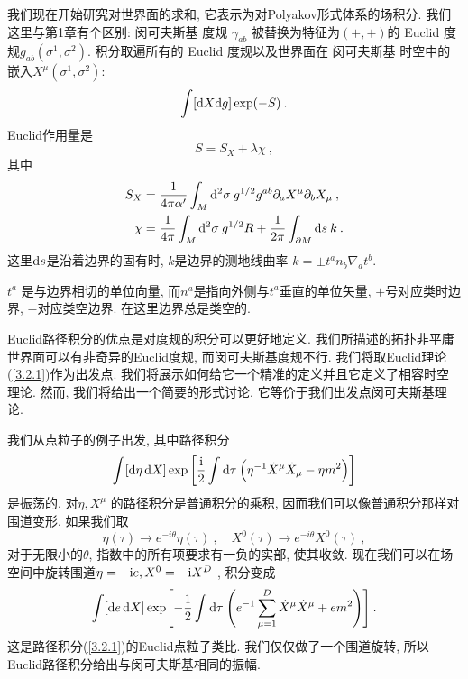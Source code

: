 我们现在开始研究对世界面的求和, 它表示为对Polyakov形式体系的场积分. 我们这里与第1章有个区别: 闵可夫斯基 度规 $\gamma_{ab}$ 被替换为特征为$(+,+)$的 Euclid 度规$g_{a b}(\sigma^{1}, \sigma^{2})$. 积分取遍所有的 Euclid 度规以及世界面在 闵可夫斯基 时空中的嵌入$X^{\mu}(\sigma^{1}, \sigma^{2})$: 
\begin{equation}\label{3.2.1}
\int[\mathrm{d} X \mathrm{d} g] \exp (-S) \:.
\end{equation}
Euclid作用量是
\begin{equation}
S=S_{X}+\lambda \chi \:, \label{3.2.2}
\end{equation}
其中
\begin{subequations}\label{3.2.3}
\begin{align}
S_{X}&=\frac{1}{4 \pi \alpha^{\prime}} \int_{M} \mathrm{d}^{2} \sigma \: g^{1 / 2} g^{a b} \partial_{a} X^{\mu} \partial_{b} X_{\mu} \:, \label{3.2.3a} \\
\chi&=\frac{1}{4 \pi} \int_{M} \mathrm{d}^{2} \sigma \: g^{1 / 2} R+\frac{1}{2 \pi} \int_{\partial M} \mathrm{d} s\: k \:. \label{3.2.3b}
\end{align}
\end{subequations}
这里$\mathrm{d} s$是沿着边界的固有时, $k$是边界的测地线曲率 $k=\pm t^{a} n_{b} \nabla_{a} t^{b}$. \\
\begin{remark}
$t^a$ 是与边界相切的单位向量, 而$n^a$是指向外侧与$t^a$垂直的单位矢量, $+$号对应类时边界, $-$对应类空边界. 在这里边界总是类空的. 
\end{remark}

Euclid路径积分的优点是对度规的积分可以更好地定义. 我们所描述的拓扑非平庸世界面可以有非奇异的Euclid度规, 而闵可夫斯基度规不行. 我们将取Euclid理论(\ref{3.2.1})作为出发点. 我们将展示如何给它一个精准的定义并且它定义了相容时空理论. 然而, 我们将给出一个简要的形式讨论, 它等价于我们出发点闵可夫斯基理论. 

我们从点粒子的例子出发, 其中路径积分
\begin{equation}
\int[\mathrm{d} \eta \, \mathrm{d} X] \exp \left[\frac{\mathrm{i}}{2} \int \mathrm{d} \tau\: \Bigl(\eta^{-1} \dot{X}^{\mu} \dot{X}_{\mu}-\eta m^{2}\Bigr)\right] \label{3.2.4}
\end{equation}
是振荡的. 对$\eta, X^\mu$ 的路径积分是普通积分的乘积, 因而我们可以像普通积分那样对围道变形. 如果我们取
\begin{equation}
\eta(\tau) \rightarrow e^{-i \theta} \eta(\tau)\:, \quad X^{0}(\tau) \rightarrow e^{-i \theta} X^{0}(\tau) \:, \label{3.2.5}
\end{equation}
对于无限小的$\theta$, 指数中的所有项要求有一负的实部, 使其收敛. 现在我们可以在场空间中旋转围道$\eta=-\mathrm{i} e, X^{0}=-\mathrm{i} X^{D}$ , 积分变成
\begin{equation}
\int[\mathrm{d} e \, \mathrm{d} X] \exp \Biggl[-\frac{1}{2} \int \mathrm{d} \tau \: \Biggl(e^{-1} \sum_{\mu=1}^{D} \dot{X}^{\mu} \dot{X}^{\mu}+e m^{2}\Biggr)\Biggr] \:. \label{3.2.6}
\end{equation}
这是路径积分(\ref{3.2.1})的Euclid点粒子类比. 我们仅仅做了一个围道旋转, 所以Euclid路径积分给出与闵可夫斯基相同的振幅. 

